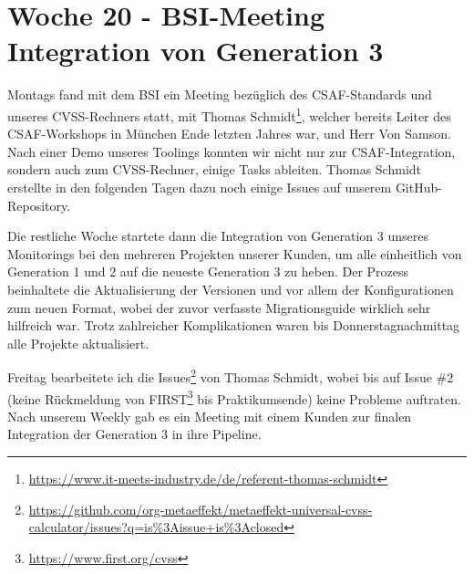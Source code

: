 \section{Woche 20 - BSI-Meeting \headerand Integration von Generation 3} \label{sec:bericht-wo-20}


\lweekdaymarginpar{\weekdayMondayLong}

Montags fand mit dem BSI ein Meeting bezüglich des CSAF-Standards und unseres CVSS-Rechners statt, mit Thomas Schmidt\footnote{\url{https://www.it-meets-industry.de/de/referent-thomas-schmidt}}, welcher bereits Leiter des CSAF-Workshops in München Ende letzten Jahres war, und Herr Von Samson.
Nach einer Demo unseres Toolings konnten wir nicht nur zur CSAF-Integration, sondern auch zum CVSS-Rechner, einige Tasks ableiten.
Thomas Schmidt erstellte in den folgenden Tagen dazu noch einige Issues auf unserem GitHub-Repository.

\sweekdaymarginpar{\weekdayTuesdayShort\ - \weekdayThursdayShort}

Die restliche Woche startete dann die Integration von Generation 3 unseres Monitorings bei den mehreren Projekten unserer Kunden, um alle einheitlich von Generation 1 und 2 auf die neueste Generation 3 zu heben.
Der Prozess beinhaltete die Aktualisierung der Versionen und vor allem der Konfigurationen zum neuen Format, wobei der zuvor verfasste Migrationsguide wirklich sehr hilfreich war.
Trotz zahlreicher Komplikationen waren bis Donnerstagnachmittag alle Projekte aktualisiert.

\sweekdaymarginpar{\weekdayFridayLong}

Freitag bearbeitete ich die Issues\footnote{\url{https://github.com/org-metaeffekt/metaeffekt-universal-cvss-calculator/issues?q=is\%3Aissue+is\%3Aclosed}} von Thomas Schmidt, wobei bis auf Issue \#2 (keine Rückmeldung von FIRST\footnote{\url{https://www.first.org/cvss}} bis Praktikumsende) keine Probleme auftraten.
Nach unserem Weekly gab es ein Meeting mit einem Kunden zur finalen Integration der Generation 3 in ihre Pipeline.
